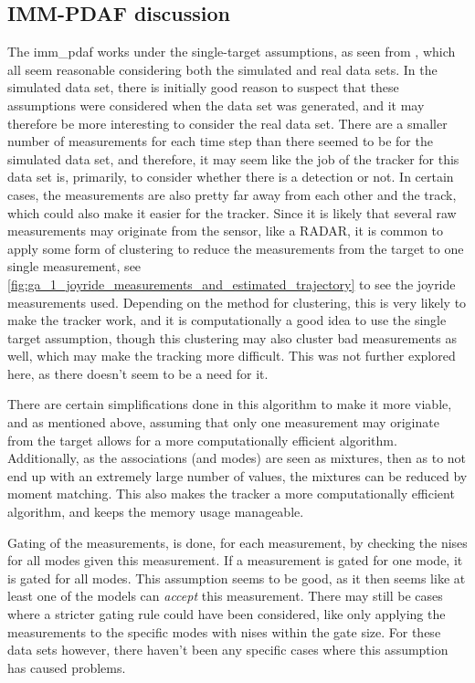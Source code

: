 \subsection{IMM-PDAF discussion}
The \acrshort{imm_pdaf} works under the single-target assumptions, as seen from \cite[p. 105]{Edmund}, which all seem reasonable considering both the simulated and real data sets. In the simulated data set, there is initially good reason to suspect that these assumptions were considered when the data set was generated, and it may therefore be more interesting to consider the real data set. There are a smaller number of measurements for each time step than there seemed to be for the simulated data set, and therefore, it may seem like the job of the tracker for this data set is, primarily, to consider whether there is a detection or not. In certain cases, the measurements are also pretty far away from each other and the track, which could also make it easier for the tracker. Since it is likely that several raw measurements may originate from the sensor, like a RADAR, it is common to apply some form of clustering to reduce the measurements from the target to one single measurement, see \cref{fig:ga_1_joyride_measurements_and_estimated_trajectory} to see the joyride measurements used. Depending on the method for clustering, this is very likely to make the tracker work, and it is computationally a good idea to use the single target assumption, though this clustering may also cluster bad measurements as well, which may make the tracking more difficult. This was not further explored here, as there doesn't seem to be a need for it. 

There are certain simplifications done in this algorithm to make it more viable, and as mentioned above, assuming that only one measurement may originate from the target allows for a more computationally efficient algorithm. Additionally, as the associations (and modes) are seen as mixtures, then as to not end up with an extremely large number of values, the mixtures can be reduced by moment matching. This also makes the tracker a more computationally efficient algorithm, and keeps the memory usage manageable. 

Gating of the measurements, is done, for each measurement, by checking the \acrshort{nis}es for all modes given this measurement. If a measurement is gated for one mode, it is gated for all modes. This assumption seems to be good, as it then seems like at least one of the models can \textit{accept} this measurement. There may still be cases where a stricter gating rule could have been considered, like only applying the measurements to the specific modes with \acrshort{nis}es within the gate size. For these data sets however, there haven't been any specific cases where this assumption has caused problems. 

